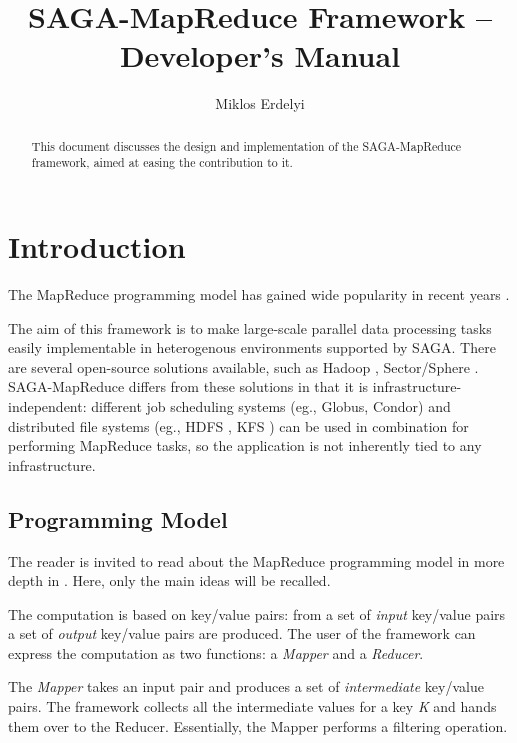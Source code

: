 \documentclass{article}
\begin{document}
\title{SAGA-MapReduce Framework -- Developer's Manual}
\author{Miklos Erdelyi \footnotemark}
\maketitle


\begin{abstract}

  This document discusses the design and implementation of the SAGA-MapReduce framework, aimed at easing the contribution to it.

\end{abstract}

\tableofcontents

\section{Introduction}

The MapReduce programming model has gained wide popularity in recent years \cite{mapreduce, hadoop}.

The aim of this framework is to make large-scale parallel data processing tasks easily implementable in heterogenous environments supported by SAGA. There are several open-source solutions available, such as Hadoop \cite{hadoop}, Sector/Sphere \cite{sector}. SAGA-MapReduce differs from these solutions in that it is infrastructure-independent: different job scheduling systems (eg., Globus, Condor) and distributed file systems (eg., HDFS \cite{hdfs}, KFS \cite{kfs}) can be used in combination for performing MapReduce tasks, so the application is not inherently tied to any infrastructure.


\subsection{Programming Model}

The reader is invited to read about the MapReduce programming model in more depth in \cite{mapreduce}. Here, only the main ideas will be recalled.

The computation is based on key/value pairs: from a set of \emph{input} key/value pairs a set of \emph{output} key/value pairs are produced. The user of the framework can express the computation as two functions: a \emph{Mapper} and a \emph{Reducer}.

The \emph{Mapper} takes an input pair and produces a set of \emph{intermediate} key/value pairs. The framework collects all the intermediate values for a key \emph{K} and hands them over to the Reducer. Essentially, the Mapper performs a filtering operation.
\end{document}
